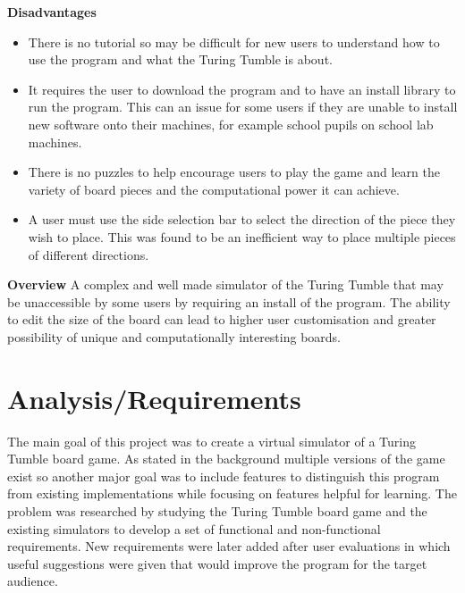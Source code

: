 \documentclass{l4proj}
\begin{document}
\textbf{Disadvantages}
\begin{itemize}
    \item There is no tutorial so may be difficult for new users to understand how to use the program and what the Turing Tumble is about.
    \item It requires the user to download the program and to have an install library to run the program. This can an issue for some users if they are unable to install new software onto their machines, for example school pupils on school lab machines.
    \item There is no puzzles to help encourage users to play the game and learn the variety of board pieces and the computational power it can achieve.
    \item A user must use the side selection bar to select the direction of the piece they wish to place. This was found to be an inefficient way to place multiple pieces of different directions.
\end{itemize}

\textbf{Overview}
A complex and well made simulator of the Turing Tumble that may be unaccessible by some users by requiring an install of the program. The ability to edit the size of the board can lead to higher user customisation and greater possibility of unique and computationally interesting boards. 
\chapter{Analysis/Requirements}
\label{section:reqs}



The main goal of this project was to create a virtual simulator of a Turing Tumble board game. As stated in the background multiple versions of the game exist so another major goal was to include features to distinguish this program from existing implementations while focusing on features helpful for learning. The problem was researched by studying the Turing Tumble board game and the existing simulators to develop a set of functional and non-functional requirements. New requirements were later added after user evaluations in which useful suggestions were given that would improve the program for the target audience.
\end{document}
